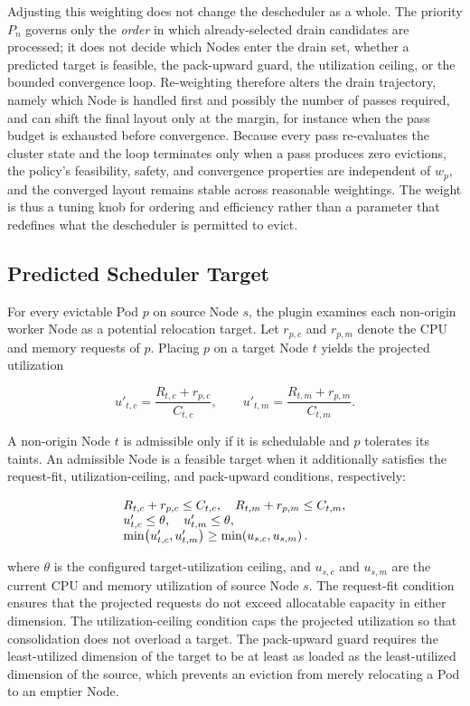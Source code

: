 Adjusting this weighting does not change the descheduler as a whole. The priority \(P_n\) governs only the \emph{order} in which already-selected drain candidates are processed; it does not decide which Nodes enter the drain set, whether a predicted target is feasible, the pack-upward guard, the utilization ceiling, or the bounded convergence loop. Re-weighting therefore alters the drain trajectory, namely which Node is handled first and possibly the number of passes required, and can shift the final layout only at the margin, for instance when the pass budget is exhausted before convergence. Because every pass re-evaluates the cluster state and the loop terminates only when a pass produces zero evictions, the policy's feasibility, safety, and convergence properties are independent of \(w_p\), and the converged layout remains stable across reasonable weightings. The weight is thus a tuning knob for ordering and efficiency rather than a parameter that redefines what the descheduler is permitted to evict.

\subsection{Predicted Scheduler Target}
\label{sec:defrag_target_prediction}

For every evictable Pod \(p\) on source Node \(s\), the plugin examines each non-origin worker Node as a potential relocation target. Let \(r_{p,c}\) and \(r_{p,m}\) denote the CPU and memory requests of \(p\). Placing \(p\) on a target Node \(t\) yields the projected utilization

\[
    u'_{t,c} = \frac{R_{t,c} + r_{p,c}}{C_{t,c}},
    \qquad
    u'_{t,m} = \frac{R_{t,m} + r_{p,m}}{C_{t,m}}.
\]

A non-origin Node \(t\) is admissible only if it is schedulable and \(p\) tolerates its taints. An admissible Node is a feasible target when it additionally satisfies the request-fit, utilization-ceiling, and pack-upward conditions, respectively:

\[
\begin{array}{@{}l@{}}
    R_{t,c} + r_{p,c} \leq C_{t,c},\quad
    R_{t,m} + r_{p,m} \leq C_{t,m},\\
    u'_{t,c} \leq \theta,\quad
    u'_{t,m} \leq \theta,\\
    \min\!\left(u'_{t,c}, u'_{t,m}\right)
    \geq \min\!\left(u_{s,c}, u_{s,m}\right).
\end{array}
\]

where \(\theta\) is the configured target-utilization ceiling, and \(u_{s,c}\) and \(u_{s,m}\) are the current CPU and memory utilization of source Node \(s\). The request-fit condition ensures that the projected requests do not exceed allocatable capacity in either dimension. The utilization-ceiling condition caps the projected utilization so that consolidation does not overload a target. The pack-upward guard requires the least-utilized dimension of the target to be at least as loaded as the least-utilized dimension of the source, which prevents an eviction from merely relocating a Pod to an emptier Node.

